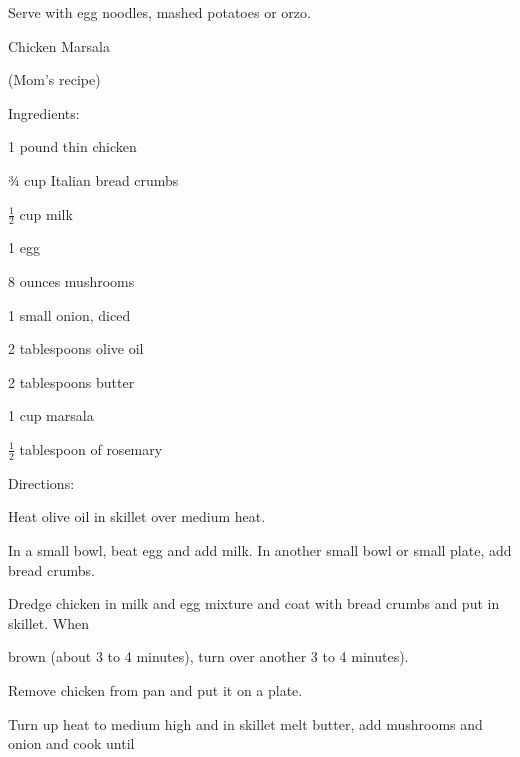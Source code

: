 \documentclass[a4paper,portrait,12pt]{book}
\begin{document}
Serve with egg noodles, mashed potatoes or orzo.







\newpage
Chicken Marsala




(Mom's recipe)




Ingredients:




1 pound thin chicken




¾ cup Italian bread crumbs




$\frac{1}{2}$ cup milk




1 egg




8 ounces mushrooms




1 small onion, diced




2 tablespoons olive oil




2 tablespoons butter




1 cup marsala




$\frac{1}{2}$ tablespoon of rosemary




Directions:




Heat olive oil in skillet over medium heat.




In a small bowl, beat egg and add milk. In another small bowl or small plate, add bread crumbs.




Dredge chicken in milk and egg mixture and coat with bread crumbs and put in skillet. When




brown (about 3 to 4 minutes), turn over another 3 to 4 minutes).




Remove chicken from pan and put it on a plate.




Turn up heat to medium high and in skillet melt butter, add mushrooms and onion and cook until
\end{document}
